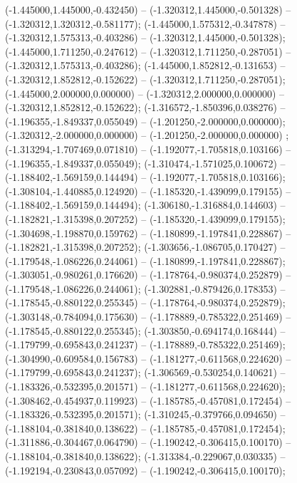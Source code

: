  (-1.445000,1.445000,-0.432450) -- (-1.320312,1.445000,-0.501328) -- (-1.320312,1.320312,-0.581177);
 (-1.445000,1.575312,-0.347878) -- (-1.320312,1.575313,-0.403286) -- (-1.320312,1.445000,-0.501328);
 (-1.445000,1.711250,-0.247612) -- (-1.320312,1.711250,-0.287051) -- (-1.320312,1.575313,-0.403286);
 (-1.445000,1.852812,-0.131653) -- (-1.320312,1.852812,-0.152622) -- (-1.320312,1.711250,-0.287051);
 (-1.445000,2.000000,0.000000) -- (-1.320312,2.000000,0.000000) -- (-1.320312,1.852812,-0.152622);
 (-1.316572,-1.850396,0.038276) -- (-1.196355,-1.849337,0.055049) -- (-1.201250,-2.000000,0.000000);
 (-1.320312,-2.000000,0.000000) -- (-1.201250,-2.000000,0.000000) ;
 (-1.313294,-1.707469,0.071810) -- (-1.192077,-1.705818,0.103166) -- (-1.196355,-1.849337,0.055049);
 (-1.310474,-1.571025,0.100672) -- (-1.188402,-1.569159,0.144494) -- (-1.192077,-1.705818,0.103166);
 (-1.308104,-1.440885,0.124920) -- (-1.185320,-1.439099,0.179155) -- (-1.188402,-1.569159,0.144494);
 (-1.306180,-1.316884,0.144603) -- (-1.182821,-1.315398,0.207252) -- (-1.185320,-1.439099,0.179155);
 (-1.304698,-1.198870,0.159762) -- (-1.180899,-1.197841,0.228867) -- (-1.182821,-1.315398,0.207252);
 (-1.303656,-1.086705,0.170427) -- (-1.179548,-1.086226,0.244061) -- (-1.180899,-1.197841,0.228867);
 (-1.303051,-0.980261,0.176620) -- (-1.178764,-0.980374,0.252879) -- (-1.179548,-1.086226,0.244061);
 (-1.302881,-0.879426,0.178353) -- (-1.178545,-0.880122,0.255345) -- (-1.178764,-0.980374,0.252879);
 (-1.303148,-0.784094,0.175630) -- (-1.178889,-0.785322,0.251469) -- (-1.178545,-0.880122,0.255345);
 (-1.303850,-0.694174,0.168444) -- (-1.179799,-0.695843,0.241237) -- (-1.178889,-0.785322,0.251469);
 (-1.304990,-0.609584,0.156783) -- (-1.181277,-0.611568,0.224620) -- (-1.179799,-0.695843,0.241237);
 (-1.306569,-0.530254,0.140621) -- (-1.183326,-0.532395,0.201571) -- (-1.181277,-0.611568,0.224620);
 (-1.308462,-0.454937,0.119923) -- (-1.185785,-0.457081,0.172454) -- (-1.183326,-0.532395,0.201571);
 (-1.310245,-0.379766,0.094650) -- (-1.188104,-0.381840,0.138622) -- (-1.185785,-0.457081,0.172454);
 (-1.311886,-0.304467,0.064790) -- (-1.190242,-0.306415,0.100170) -- (-1.188104,-0.381840,0.138622);
 (-1.313384,-0.229067,0.030335) -- (-1.192194,-0.230843,0.057092) -- (-1.190242,-0.306415,0.100170);
